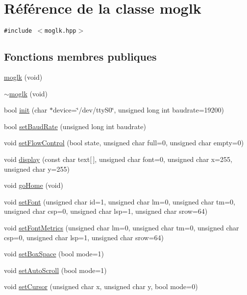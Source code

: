 \hypertarget{classmoglk}{
\section{Référence de la classe moglk}
\label{classmoglk}
}
{\tt \#include $<$moglk.hpp$>$}

\subsection*{Fonctions membres publiques}
\begin{CompactItemize}
\item 
\hyperlink{classmoglk_3f753134676c7d36a96e6d4439cc0348}{moglk} (void)
\item 
\hyperlink{classmoglk_19ba0cf0910a364b32685b1806a98773}{$\sim$moglk} (void)
\item 
bool \hyperlink{classmoglk_2b26bc8f68f3b4efcac9d1e6d902b695}{init} (char $\ast$device=\char`\"{}/dev/ttyS0\char`\"{}, unsigned long int baudrate=19200)
\item 
bool \hyperlink{classmoglk_788fca7601af41bd23d2f310ecc34100}{setBaudRate} (unsigned long int baudrate)
\item 
void \hyperlink{classmoglk_09137664a708707066b2705b3a6d6894}{setFlowControl} (bool state, unsigned char full=0, unsigned char empty=0)
\item 
void \hyperlink{classmoglk_cf30cd08a2e1434e68b386236f4060bd}{display} (const char text\mbox{[}$\,$\mbox{]}, unsigned char font=0, unsigned char x=255, unsigned char y=255)
\item 
void \hyperlink{classmoglk_1f33a99d62509dfd98ca6898ba5a228e}{goHome} (void)
\item 
void \hyperlink{classmoglk_cfb8813e8db8de6ef0f34e479952589b}{setFont} (unsigned char id=1, unsigned char lm=0, unsigned char tm=0, unsigned char csp=0, unsigned char lsp=1, unsigned char srow=64)
\item 
void \hyperlink{classmoglk_17c4f023df63951df9f19f08c56f8786}{setFontMetrics} (unsigned char lm=0, unsigned char tm=0, unsigned char csp=0, unsigned char lsp=1, unsigned char srow=64)
\item 
void \hyperlink{classmoglk_ad564fea38cd80622152c152bfe62f4e}{setBoxSpace} (bool mode=1)
\item 
void \hyperlink{classmoglk_38e9c9bda5fbe192d696ae67246c0bef}{setAutoScroll} (bool mode=1)
\item 
void \hyperlink{classmoglk_15e0fbeefcab8874138e8865c53e204c}{setCursor} (unsigned char x, unsigned char y, bool mode=0)

\end{CompactItemize}
